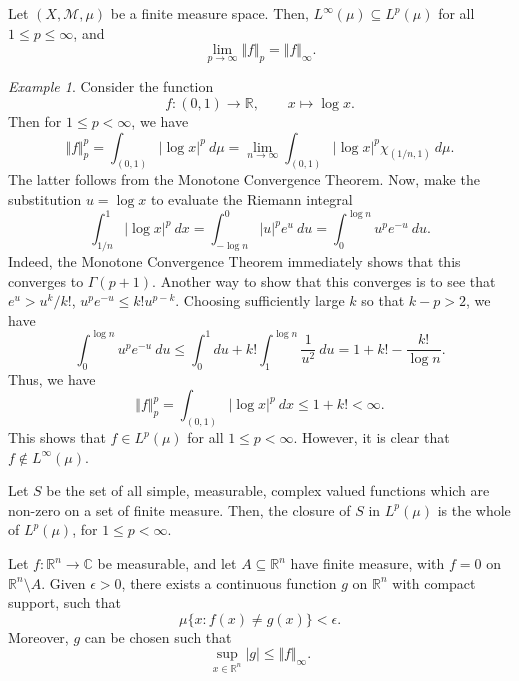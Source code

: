 \documentclass[11pt]{article}
\newcommand{\C}{\mathbb{C}}
\newcommand{\R}{\mathbb{R}}
\newcommand{\M}{\mathcal{M}}
\newcommand{\norm}[1]{\Vert #1 \Vert}
\theoremstyle{definition}
\theoremstyle{remark}
\newtheorem*{example}{Example}
\numberwithin{equation}{section}
\begin{document}
    \begin{theorem}
        Let $(X, \M, \mu)$ be a finite measure space. Then, $L^\infty(\mu) \subseteq
        L^p(\mu)$ for all $1 \leq p \leq \infty$, and \[
            \lim_{p \to \infty} \norm{f}_p = \norm{f}_\infty.
        \]
    \end{theorem}
    \begin{example}
        Consider the function \[
            f\colon (0, 1) \to \R, \qquad x \mapsto \log{x}.
        \] Then for $1 \leq p < \infty$, we have \[
            \norm{f}_p^p = \int_{(0, 1)} |\log{x}|^p\:d\mu = \lim_{n \to \infty}
            \int_{(0, 1)} |\log{x}|^p\chi_{(1/n, 1)}\:d\mu.
        \] The latter follows from the Monotone Convergence Theorem. Now, make the
        substitution $u = \log{x}$ to evaluate the Riemann integral \[
            \int_{1 / n}^1 |\log{x}|^p\:dx = \int_{-\log{n}}^0 |u|^p e^{u}\:du
            = \int_0^{\log{n}} u^p e^{-u}\:du.
        \] Indeed, the Monotone Convergence Theorem immediately shows that this
        converges to $\Gamma(p + 1)$. Another way to show that this converges is to
        see that $e^u > u^k / k!$, $u^pe^{-u} \leq k!u^{p - k}$. Choosing
        sufficiently large $k$ so that $k - p > 2$, we have \[
            \int_0^{\log{n}} u^p e^{-u}\:du \leq \int_0^1 du + k!\int_1^{\log{n}}
            \frac{1}{u^2}\:du = 1 + k! - \frac{k!}{\log{n}}.
        \] Thus, we have \[
            \norm{f}_p^p = \int_{(0, 1)}|\log{x}|^p\:dx \leq 1 + k! < \infty.
        \] This shows that $f \in L^p(\mu)$ for all $1 \leq p < \infty$. However, it
        is clear that $f \notin L^\infty(\mu)$.
    \end{example}

    \begin{theorem}
        Let $S$ be the set of all simple, measurable, complex valued functions which
        are non-zero on a set of finite measure. Then, the closure of $S$ in
        $L^p(\mu)$ is the whole of $L^p(\mu)$, for $1 \leq p < \infty$.
    \end{theorem}

    \begin{theorem}[Lusin]
        Let $f\colon \R^n \to \C$ be measurable, and let $A\subseteq \R^n$ have
        finite measure, with $f = 0$ on $\R^n \setminus A$. Given $\epsilon > 0$,
        there exists a continuous function $g$ on $\R^n$ with compact support, such
        that \[
            \mu\{x: f(x) \neq g(x)\} < \epsilon.
        \] Moreover, $g$ can be chosen such that \[
            \sup_{x \in \R^n} |g| \leq \norm{f}_\infty.
        \]
    \end{theorem}
\end{document}
